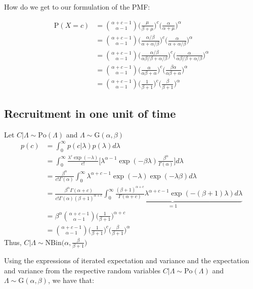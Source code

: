 How do we get to our formulation of the PMF:

\begin{align*}
\textrm{P}(X=c) & = \binom{\alpha+c-1}{\alpha-1}\Bigg (\frac{\mu}{\beta+\mu}\Bigg)^{c} \Bigg(\frac{\alpha}{\alpha+\mu}\Bigg)^{\alpha} \\
& = \binom{\alpha+c-1}{\alpha-1}\Bigg (\frac{\alpha/\beta}{\alpha+\alpha/\beta}\Bigg)^{c} \Bigg(\frac{\alpha}{\alpha+\alpha/\beta}\Bigg)^{\alpha} \\
& = \binom{\alpha+c-1}{\alpha-1}\Bigg (\frac{\alpha/\beta}{\alpha\beta/\beta+\alpha/\beta}\Bigg)^{c} \Bigg(\frac{\alpha}{\alpha\beta/\beta+\alpha/\beta}\Bigg)^{\alpha} \\
& = \binom{\alpha+c-1}{\alpha-1}\Bigg (\frac{\alpha}{\alpha\beta+\alpha}\Bigg)^{c} \Bigg(\frac{\beta\alpha}{\alpha\beta+\alpha}\Bigg)^{\alpha} \\
&= \binom{\alpha+c-1}{\alpha-1}\Bigg (\frac{1}{\beta+1}\Bigg)^{c} \Bigg(\frac{\beta}{\beta+1}\Bigg)^{\alpha}
\end{align*}

\subsection{Recruitment in one unit of time}
Let $C|\Lambda \sim \textrm{Po}(\Lambda)$ and $\Lambda \sim \textrm{G}(\alpha,\beta)$
\begin{align*}
p(c)&=\int^\infty_0 p(c|\lambda) p(\lambda) d\lambda\\
&=\int^\infty_0 \frac{\lambda^c\exp(-\lambda)}{c!}\Bigg[\lambda^{\alpha-1}\exp(-\beta\lambda)\frac{\beta^\alpha}{\Gamma(\alpha)}\Bigg]d\lambda\\
&=\frac{\beta^\alpha}{c!\Gamma(\alpha)}\int^\infty_0 \lambda^{\alpha+c-1}\exp(-\lambda)\exp(-\lambda\beta)d\lambda\\
&=\frac{\beta^\alpha\Gamma(\alpha+c)}{c!\Gamma(\alpha) (\beta+1)^{\alpha+c}}\underbrace{\int^\infty_0 \frac{(\beta+1)^{\alpha+c}}{\Gamma(\alpha+c)} \lambda^{\alpha+c-1}\exp(-(\beta+1)\lambda)d\lambda}_{=1}\\
&=\beta^\alpha\binom{\alpha+c-1}{\alpha-1}\Bigg (\frac{1}{\beta+1}\Bigg)^{\alpha+c}\\
&=\binom{\alpha+c-1}{\alpha-1}\Bigg (\frac{1}{\beta+1}\Bigg)^{c} \Bigg(\frac{\beta}{\beta+1}\Bigg)^{\alpha}
\end{align*}
Thus, $C|\Lambda\sim \textrm{NBin} \Bigg(\alpha, \frac{\beta}{\beta+1}\Bigg)$



Using the expressions of iterated expectation and variance \citep{held2014applied} and the expectation and variance from the respective random variables $C|\Lambda \sim \textrm{Po}(\Lambda)$ and $\Lambda \sim \textrm{G}(\alpha,\beta)$, we have that:



